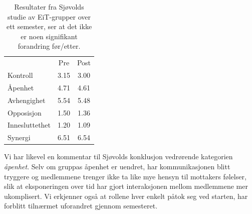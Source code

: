 \begin{table}[ht!]
\centering
\begin{tabular}{l c c}
& Pre & Post  \\
Kontroll & 3.15 & 3.00 \\
Åpenhet & 4.71 & 4.61 \\
Avhengighet & 5.54 & 5.48 \\
Opposisjon & 1.50 & 1.36 \\
Innesluttethet & 1.20 & 1.09 \\
Synergi & 6.51 & 6.54 \\
\end{tabular}
\caption{Resultater fra Sjøvolds studie av EiT-grupper over ett semester, ser at
det ikke er noen signifikant forandring før/etter.}
\label{tab:sjovold}
\end{table}

Vi har likevel en kommentar til Sjøvolds konklusjon vedrørende kategorien
\emph{åpenhet}. Selv om gruppas åpenhet er uendret, har kommunikasjonen blitt
tryggere og medlemmene trenger ikke ta like mye hensyn til mottakers følelser, 
slik at eksponeringen over tid har gjort interaksjonen mellom
medlemmene mer ukomplisert. Vi erkjenner også at rollene hver enkelt påtok
seg ved starten, har forblitt tilnærmet uforandret gjennom semesteret.
